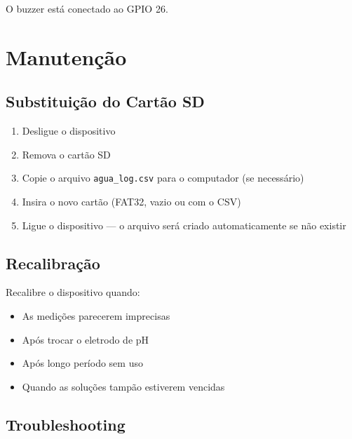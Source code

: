 \documentclass[12pt,a4paper]{article}
\begin{document}
O buzzer está conectado ao GPIO 26.

\section{Manutenção}

\subsection{Substituição do Cartão SD}

\begin{enumerate}[nosep]
  \item Desligue o dispositivo
  \item Remova o cartão SD
  \item Copie o arquivo \texttt{agua\_log.csv} para o computador (se necessário)
  \item Insira o novo cartão (FAT32, vazio ou com o CSV)
  \item Ligue o dispositivo --- o arquivo será criado automaticamente se não existir
\end{enumerate}

\subsection{Recalibração}

Recalibre o dispositivo quando:
\begin{itemize}[nosep]
  \item As medições parecerem imprecisas
  \item Após trocar o eletrodo de pH
  \item Após longo período sem uso
  \item Quando as soluções tampão estiverem vencidas
\end{itemize}

\subsection{Troubleshooting}
\end{document}
